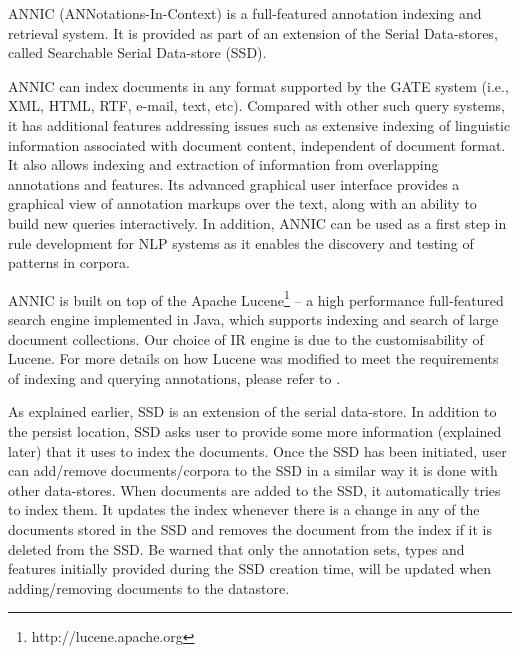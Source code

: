 
\nnormalsize

ANNIC (ANNotations-In-Context) is a full-featured annotation indexing and 
retrieval system.  It is provided as part of an extension of the Serial 
Data-stores, called Searchable Serial Data-store (SSD).

ANNIC can index documents in any format supported by the GATE system
(i.e., XML, HTML, RTF, e-mail, text, etc). Compared with other such query
systems, it has additional features addressing issues such as extensive indexing 
of linguistic information associated with document content, independent of 
document format. It also allows indexing and extraction of information from 
overlapping annotations and features. Its advanced graphical user interface 
provides a graphical view of annotation markups over the text, along with an 
ability to build new queries interactively. In addition, ANNIC can be used as 
a first step in rule development for NLP systems as it enables the discovery 
and testing of patterns in corpora. 

ANNIC is built on top of the Apache
Lucene\footnote{http://lucene.apache.org} -- a high performance full-featured
search engine implemented in Java, which supports indexing and search of large
document collections. Our choice of IR engine is due to the customisability of
Lucene. For more details on how Lucene was modified to meet the requirements of
indexing and querying annotations, please refer to \cite{Aswani05}.

As explained earlier, SSD is an extension of the serial data-store. In
addition to the persist location, SSD asks user to provide some more
information (explained later) that it uses to index the
documents. Once the SSD has been initiated, user can add/remove
documents/corpora to the SSD in a similar way it is done with other
data-stores.  When documents are added to the SSD, it automatically
tries to index them. It updates the index whenever there is a change
in any of the documents stored in the SSD and removes the document
from the index if it is deleted from the SSD. Be warned that only the
annotation sets, types and features initially provided during the SSD creation 
time, will be updated when adding/removing documents to the datastore.

